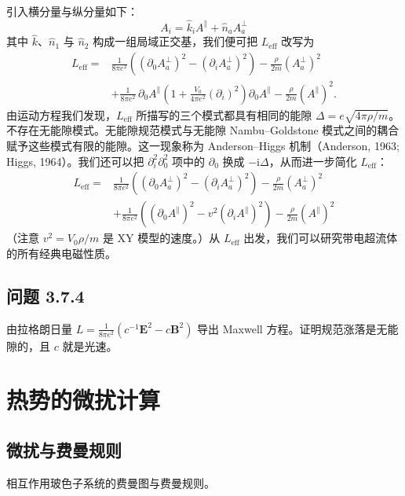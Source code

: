 引入横分量与纵分量如下：
\begin{equation*}
A_{i} = \hat{k}_{i}A^{\parallel} + \hat{n}_{a}A_{a}^{\perp} \tag{3.7.18}
\end{equation*}
其中 $\hat{k}$、$\hat{n}_{1}$ 与 $\hat{n}_{2}$ 构成一组局域正交基，我们便可把 $L_{\mathrm{eff}}$ 改写为
\begin{align*}
L_{\mathrm{eff}} ={}& \frac{1}{8\pi e^{2}}\left((\partial_{0}A_{a}^{\perp})^{2} - (\partial_{i}A_{a}^{\perp})^{2}\right) - \frac{\rho}{2m}(A_{a}^{\perp})^{2}\\
&+ \frac{1}{8\pi e^{2}}\,\partial_{0}A^{\parallel}\left(1 + \frac{V_{0}}{4\pi e^{2}}(\partial_{i})^{2}\right)\partial_{0}A^{\parallel} - \frac{\rho}{2m}(A^{\parallel})^{2}.
\end{align*}
由运动方程我们发现，$L_{\mathrm{eff}}$ 所描写的三个模式都具有相同的能隙 $\Delta = e\sqrt{4\pi\rho/m}$。不存在无能隙模式。无能隙规范模式与无能隙 Nambu--Goldstone 模式之间的耦合赋予这些模式有限的能隙。这一现象称为 Anderson--Higgs 机制（Anderson, 1963; Higgs, 1964）。我们还可以把 $\partial_{i}^{2}\partial_{0}^{2}$ 项中的 $\partial_{0}$ 换成 $-\mathrm{i}\Delta$，从而进一步简化 $L_{\mathrm{eff}}$：
\begin{align*}
L_{\mathrm{eff}} ={}& \frac{1}{8\pi e^{2}}\left((\partial_{0}A_{a}^{\perp})^{2} - (\partial_{i}A_{a}^{\perp})^{2}\right) - \frac{\rho}{2m}(A_{a}^{\perp})^{2}\\
&+ \frac{1}{8\pi e^{2}}\left((\partial_{0}A^{\parallel})^{2} - v^{2}(\partial_{i}A^{\parallel})^{2}\right) - \frac{\rho}{2m}(A^{\parallel})^{2} \tag{3.7.19}
\end{align*}
（注意 $v^{2}=V_{0}\rho/m$ 是 XY 模型的速度。）从 $L_{\mathrm{eff}}$ 出发，我们可以研究带电超流体的所有经典电磁性质。

\subsection*{问题 3.7.4}
由拉格朗日量 $L=\frac{1}{8\pi e^{2}}(c^{-1}\pmb{E}^{2}-c\pmb{B}^{2})$ 导出 Maxwell 方程。证明规范涨落是无能隙的，且 $c$ 就是光速。

\section{热势的微扰计算}

\subsection{微扰与费曼规则}
\begin{keypoints}
\item 相互作用玻色子系统的费曼图与费曼规则。
\end{keypoints}


